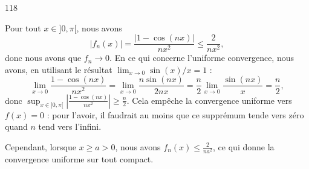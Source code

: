 

\begin{corrige}{118}

Pour tout $x\in]0,\pi[$, nous avons
\begin{equation}
	| f_n(x) |=\frac{ | 1-\cos(nx) | }{ nx^2 }\leq\frac{ 2 }{ nx^2 },
\end{equation}
donc nous avons que $f_n\to 0$. En ce qui concerne l'uniforme convergence, nous avons, en utilisant le résultat $\lim_{x\to 0}\sin(x)/x=1$ :
\begin{equation}
	\lim_{x\to 0}\frac{ 1-\cos(nx) }{ nx^2 }=\lim_{x\to 0}\frac{ n\sin(nx) }{ 2nx }=\frac{ n }{ 2 }\lim_{x\to 0}\frac{ \sin(nx) }{ x }=\frac{n}{ 2 },
\end{equation}
donc $\sup_{x\in ]0,\pi[}\left| \frac{ 1-\cos(nx) }{ nx^2 }\right|\geq \frac{n}{ 2 }$. Cela empêche la convergence uniforme vers $f(x)=0$ : pour l'avoir, il faudrait au moins que ce supprémum tende vers zéro quand $n$ tend vers l'infini.

Cependant, lorsque $x\geq a>0$, nous avons $f_n(x)\leq\frac{ 2 }{ na^2 }$, ce qui donne la convergence uniforme sur tout compact.

\end{corrige}
